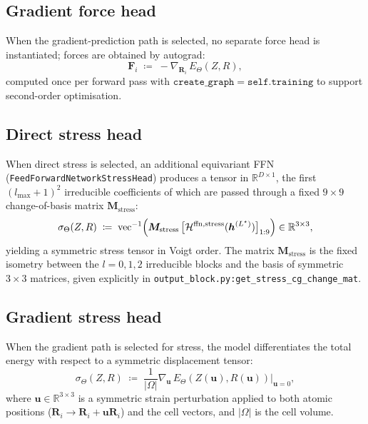 \documentclass[11pt,a4paper]{article}
\newcommand{\R}{\mathbb{R}}
\newcommand{\bR}{\bm{R}}
\newcommand{\bmF}{\bm{F}}
\newcommand{\bh}{\bm{h}}
\newcommand{\lmax}{l_{\max}}
\newcommand{\Hb}{\mathcal{H}}
\theoremstyle{plain}
\theoremstyle{definition}
\theoremstyle{remark}
\begin{document}
\subsection{Gradient force head}\label{sec:force-grad}

When the gradient-prediction path is selected, no separate force head is
instantiated; forces are obtained by autograd:
\begin{equation}\label{eq:force-grad}
    \bmF_i\;\coloneqq\;-\nabla_{\bR_i}\,E_\Theta(Z,R),
\end{equation}
computed once per forward pass with $\mathtt{create\_graph=self.training}$ to support second-order optimisation.

\subsection{Direct stress head}\label{sec:stress-direct}

When direct stress is selected, an additional equivariant FFN
(\texttt{FeedForwardNetworkStressHead}) produces a tensor in $\R^{D\times 1}$,
the first $(\lmax+1)^2$ irreducible coefficients of which are passed through a
fixed $9\times 9$ change-of-basis matrix $\bm{M}_{\mathrm{stress}}$:
\begin{equation}\label{eq:stress}
    \sigma_\Theta(Z,R)\;\coloneqq\;\mathrm{vec}^{-1}\Bigl(\bm{M}_{\mathrm{stress}}\,\bigl[\Hb^{\mathrm{ffn,stress}}(\bh^{(L^\star)})\bigr]_{1:9}\Bigr)\in\R^{3\times 3},
\end{equation}
yielding a symmetric stress tensor in Voigt order.
The matrix $\bm{M}_{\mathrm{stress}}$ is the fixed isometry between the $l=0,1,2$ irreducible blocks and the basis of symmetric $3\times 3$ matrices, given explicitly in \texttt{output\_block.py:get\_stress\_cg\_change\_mat}.

\subsection{Gradient stress head}\label{sec:stress-grad}

When the gradient path is selected for stress, the model differentiates the
total energy with respect to a symmetric displacement tensor:
\begin{equation}\label{eq:stress-grad}
    \sigma_\Theta(Z,R)\;\coloneqq\;\frac{1}{|\Omega|}\nabla_{\bm{u}}\,E_\Theta(Z(\bm{u}),R(\bm{u}))\Big|_{\bm{u}=0},
\end{equation}
where $\bm{u}\in\R^{3\times 3}$ is a symmetric strain perturbation applied to both atomic positions ($\bR_i\to\bR_i+\bm{u}\bR_i$) and the cell vectors, and $|\Omega|$ is the cell volume.
\end{document}
